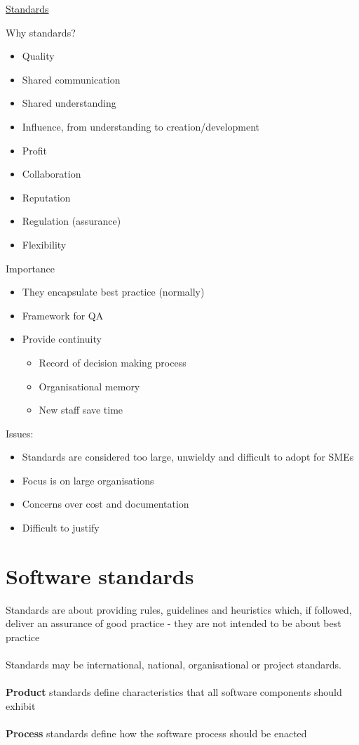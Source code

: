 \documentclass{article}[18pt]
\begin{document}
\begin{center}
\underline{\huge Standards}
\end{center}

Why standards?
\begin{itemize}
	\item Quality
	\item Shared communication
	\item Shared understanding
	\item Influence, from understanding to creation/development
	\item Profit
	\item Collaboration
	\item Reputation
	\item Regulation (assurance)
	\item Flexibility
\end{itemize}
Importance
\begin{itemize}
	\item They encapsulate best practice (normally)
	\item Framework for QA
	\item Provide continuity
	\begin{itemize}
		\item Record of decision making process
		\item Organisational memory
		\item New staff save time
	\end{itemize}
\end{itemize}
Issues:
\begin{itemize}
	\item Standards are considered too large, unwieldy and difficult to adopt for SMEs
	\item Focus is on large organisations
	\item Concerns over cost and documentation
	\item Difficult to justify
\end{itemize}
\section{Software standards}
Standards are about providing rules, guidelines and heuristics which, if followed, deliver an assurance of good practice - they are not intended to be about best practice\\
\\
Standards may be international, national, organisational or project standards.\\
\\
\textbf{Product} standards define characteristics that all software components should exhibit\\
\\
\textbf{Process} standards define how the software process should be enacted
\end{document}
